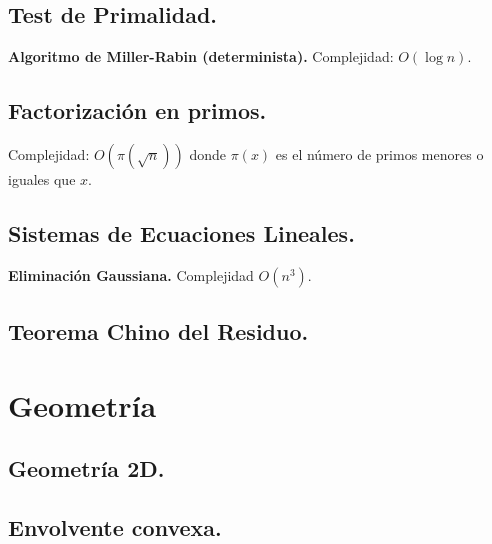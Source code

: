 \documentclass[10pt, letterpaper, twoside]{article}
\begin{document}


\subsection{Test de Primalidad.}

\textbf{Algoritmo de Miller-Rabin (determinista).} Complejidad: $O(\log n)$.

 

\subsection{Factorización en primos.}

Complejidad: $O\left(\pi\left(\sqrt{n}\right)\right)$ donde $\pi(x)$ es el número de primos menores o iguales que $x$.



\subsection{Sistemas de Ecuaciones Lineales.}

\textbf{Eliminación Gaussiana.} Complejidad $O(n^3)$.



\subsection{Teorema Chino del Residuo.}




\section{Geometría}

\subsection{Geometría 2D.}



\subsection{Envolvente convexa.}
\end{document}
